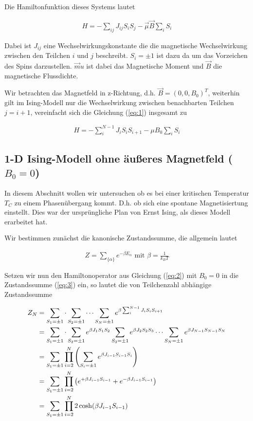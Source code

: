 Die Hamiltonfunktion dieses Systems lautet

\begin{align}
  \label{eq:1}
  H = -\sum_{ij}J_{ij}S_iS_j - \vec \mu \vec B \sum_i S_i
\end{align}

Dabei ist \(J_{ij} \) eine Wechselwirkungskonstante die die magnetische Wechselwirkung zwischen den Teilchen \(i\) und \(j\) beschreibt. \(S_i=\pm 1\) ist dazu da um das Vorzeichen des Spins darzustellen. \(\vec mu\) ist dabei das Magnetische Moment und \(\vec B\) die magnetische Flussdichte. 

Wir betrachten das Magnetfeld in z-Richtung, d.h. \(\vec B = (0,0,B_0)^T\), weiterhin gilt im Ising-Modell nur die Wechselwirkung zwischen benachbarten Teilchen \(j=i+1\), vereinfacht sich die Gleichung (\ref{eq:1}) insgesamt zu

\begin{align}
  \label{eq:2}
  H = -\sum_{i}^{N-1}J_{i}S_iS_{i+1} - \mu B_0 \sum_i S_i
\end{align}

\subsection*{1-D Ising-Modell ohne äußeres Magnetfeld ($B_0=0$)}

In diesem Abschnitt wollen wir untersuchen ob es bei einer kritischen Temperatur \(T_C\) zu einem Phasenübergang kommt. D.h. ob sich eine spontane Magnetisiertung einstellt. Dies war der ursprüngliche Plan von Ernst Ising, als dieses Modell erarbeitet hat.

Wir bestimmen zunächst die kanonische Zustandssumme, die allgemein lautet

\begin{align}
  \label{eq:3}
  Z = \sum_{\{\alpha\}} e^{-\beta E_\alpha} \text{ mit }\beta = \frac{1}{k_B T}
\end{align}

Setzen wir nun den Hamiltonoperator aus Gleichung (\ref{eq:2}) mit \(B_0=0\) in die Zustandssumme (\ref{eq:3}) ein, so lautet die von Teilchenzahl abhängige Zustandssumme

\begin{align}
  \label{eq:4}
    Z_N &= \sum_{S_1=\pm 1}\cdot\sum_{S_2=\pm 1}\cdots\sum_{S_N=\pm 1}  e^{\beta \sum_{i}^{N-1}J_{i}S_iS_{i+1}} \notag\\
&= \sum_{S_1=\pm 1}\cdot\sum_{S_2=\pm 1} e^{\beta J_{1}S_{1}S_2}\sum_{S_3=\pm 1}e^{\beta J_{2} S_2 S_3} \cdots\sum_{S_N=\pm 1}  e^{\beta J_{N-1}S_{N-1}S_{N}} \notag\\
&= \sum_{S_1=\pm 1}\prod_{i=2}^N\left( \sum_{S_i=\pm 1} e^{\beta J_{i-1}S_{i-1}S_i}\right) \notag\\
&= \sum_{S_1=\pm 1}\prod_{i=2}^N\left( e^{ + \beta J_{i-1}S_{i-1}}+ e^{ - \beta J_{i-1}S_{i-1}} \right)\notag\\
&= \sum_{S_1=\pm 1}\prod_{i=2}^N2\cosh( \beta J_{i-1}S_{i-1})
\end{align}


